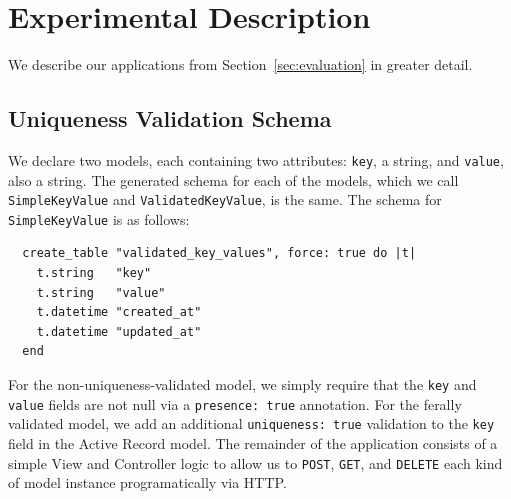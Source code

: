 \section{Experimental Description}
\label{sec:appendix-experiments}

\lstset{language=Ruby,basicstyle=\ttfamily\small,columns=fullflexible,frame=single}

We describe our applications from Section~\ref{sec:evaluation} in greater detail.

\subsection{Uniqueness Validation Schema}
\label{sec:appendix-uniqueness-schema}

We declare two models, each containing two attributes: \texttt{key}, a string, and \texttt{value}, also a string. The generated schema for each of the models, which we call \texttt{SimpleKeyValue} and \texttt{ValidatedKeyValue}, is the same. The schema for \texttt{SimpleKeyValue} is as follows:\vspace{-.5em}
\begin{lstlisting}
  create_table "validated_key_values", force: true do |t|
    t.string   "key"
    t.string   "value"
    t.datetime "created_at"
    t.datetime "updated_at"
  end
\end{lstlisting}\vspace{-.5em}
For the non-uniqueness-validated model, we simply require that the \texttt{key} and \texttt{value} fields are not null via a \texttt{presence: true} annotation.  For the ferally validated model, we add an additional \texttt{uniqueness: true} validation to the \texttt{key} field in the Active Record model. The remainder of the application consists of a simple View and Controller logic to allow us to \texttt{POST}, \texttt{GET}, and \texttt{DELETE} each kind of model instance programatically via HTTP.

